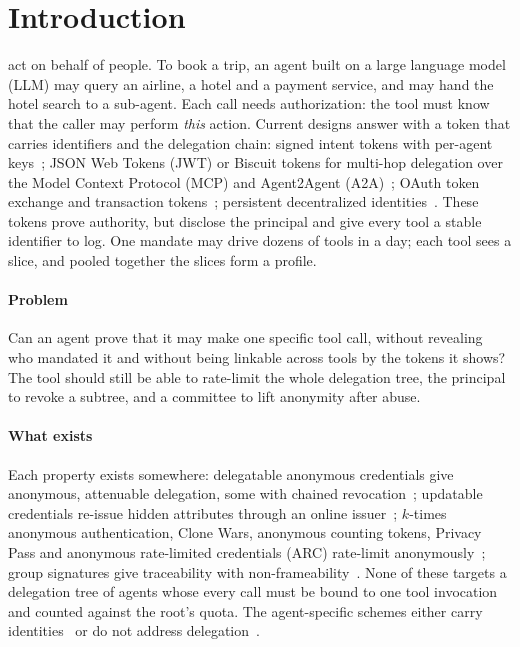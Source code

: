 \section{Introduction}
 act on behalf of people. To book a trip, an agent built on a large language model (LLM) may query an airline, a hotel and a payment service, and may hand the hotel search to a sub-agent. Each call needs authorization: the tool must know that the caller may perform \emph{this} action. Current designs answer with a token that carries identifiers and the delegation chain:
signed intent tokens with per-agent keys~\cite{goswami2025ajwt}; JSON Web Tokens (JWT) or Biscuit tokens for multi-hop delegation over the Model Context Protocol (MCP) and Agent2Agent (A2A)~\cite{prakash2026aip}; OAuth token exchange and transaction tokens~\cite{rfc8693,tulshibagwale2026txntokens}; persistent decentralized identities~\cite{zou2026intersage,garzon2026didvc}.
These tokens prove authority, but disclose the principal and give every tool a stable identifier to log. One mandate may drive dozens of tools in a day; each tool sees a slice, and pooled together the slices form a profile.

\paragraph*{Problem} Can an agent prove that it may make one specific tool call, without revealing who mandated it and without being linkable across tools by the tokens it shows? The tool should still be able to rate-limit the whole delegation tree, the principal to revoke a subtree, and a committee to lift anonymity after abuse.

\paragraph*{What exists} Each property exists somewhere:
delegatable anonymous credentials give anonymous, attenuable delegation, some with chained revocation~\cite{belenkiy2009dac,camenisch2017cdd,griffy2024dac,mir2024tdac,xie2025fdaac}; updatable credentials re-issue hidden attributes through an online issuer~\cite{blomer2019uacs,hartung2017bbaplus}; $k$-times anonymous authentication, Clone Wars, anonymous counting tokens, Privacy Pass and anonymous rate-limited credentials (ARC) rate-limit anonymously~\cite{teranishi2004ktaa,au2006bbsplus,camenisch2006clonewars,benhamouda2023act,rfc9576,yun2026arccrypto}; group signatures give traceability with non-frameability~\cite{bellare2005dynamic}.
None of these targets a delegation tree of agents whose every call must be bound to one tool invocation and counted against the root's quota. The agent-specific schemes either carry identities~\cite{goswami2025ajwt,prakash2026aip,zou2026intersage} or do not address delegation~\cite{liu2026bcm,llambi2026cva,zhou2026capbinding}.

